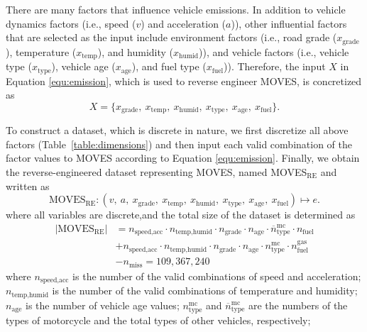 \documentclass[12pt,english]{article}
\begin{document}
There are many factors that influence vehicle emissions.
In addition to vehicle dynamics factors (i.e., speed ($v$) and acceleration ($a$)), other influential factors that are selected as the input include environment factors (i.e., road grade ($x_\text{grade}$), temperature ($x_\text{temp}$), and humidity ($x_\text{humid}$)), and vehicle factors (i.e., vehicle type ($x_\text{type}$), vehicle age ($x_\text{age}$), and fuel type ($x_\text{fuel}$)). 
%
Therefore, the input $X$ in Equation \ref{equ:emission}, which is used to reverse engineer MOVES, is concretized as
\begin{equation}\label{equ:X}
    X= \{x_\text{grade}, \ x_\text{temp}, \ x_\text{humid}, \ x_\text{type}, \ x_\text{age}, \ x_\text{fuel}\}.
\end{equation}


To construct a dataset, which is discrete in nature, we first discretize all above factors (Table~\ref{table:dimensions}) and then input each valid combination of the factor values to MOVES according to Equation \ref{equ:emission}.
Finally, we obtain the reverse-engineered dataset representing MOVES, named {MOVES}$_\text{RE}$ and written as
\begin{equation}\label{equ:MOVES_RE}
    \text{MOVES}_\text{RE}: (v, \ a, \ x_\text{grade}, \ x_\text{temp}, \ x_\text{humid}, \ x_\text{type}, \ x_\text{age}, \ x_\text{fuel}) \mapsto e.
\end{equation}
where all variables are discrete,and the total size of the dataset is determined as
\begin{equation}
\begin{aligned}
    |\text{MOVES}_\text{RE}| &= n_\text{speed,acc} \cdot n_\text{temp,humid} \cdot n_\text{grade} \cdot n_\text{age}  \cdot \overline{n}_\text{type}^\text{mc} \cdot n_\text{fuel} \\
    &+ n_\text{speed,acc} \cdot n_\text{temp,humid} \cdot n_\text{grade} \cdot  n_\text{age} \cdot n_\text{type}^\text{mc} \cdot n_\text{fuel}^\text{gas} \\
    &- n_\text{miss} = 109,367,240
\end{aligned}
\end{equation}
where $n_\text{speed,acc}$ is the number of the valid combinations of speed and acceleration;
$n_\text{temp,humid}$ is the number of the valid combinations of temperature and humidity; $n_\text{age}$ is the number of vehicle age values; 
$n_\text{type}^\text{mc}$ and $\overline{n}_\text{type}^\text{mc}$ are the numbers of the types of motorcycle and the total types of other vehicles, respectively;
\end{document}
